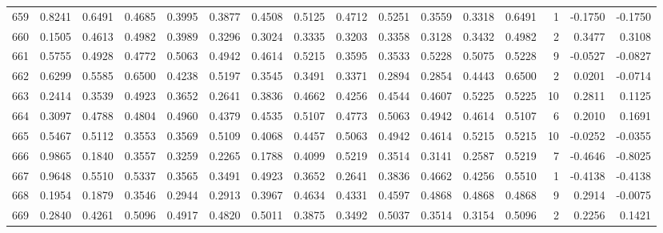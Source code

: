 \begin{tabular}{lrrrrrrrrrrrrrrr}
659 &      0.8241 &  0.6491 &  0.4685 &  0.3995 &  0.3877 &  0.4508 &  0.5125 &  0.4712 &  0.5251 &  0.3559 &   0.3318 &     0.6491 &      1 &                   -0.1750 &                    -0.1750 \\
660 &      0.1505 &  0.4613 &  0.4982 &  0.3989 &  0.3296 &  0.3024 &  0.3335 &  0.3203 &  0.3358 &  0.3128 &   0.3432 &     0.4982 &      2 &                    0.3477 &                     0.3108 \\
661 &      0.5755 &  0.4928 &  0.4772 &  0.5063 &  0.4942 &  0.4614 &  0.5215 &  0.3595 &  0.3533 &  0.5228 &   0.5075 &     0.5228 &      9 &                   -0.0527 &                    -0.0827 \\
662 &      0.6299 &  0.5585 &  0.6500 &  0.4238 &  0.5197 &  0.3545 &  0.3491 &  0.3371 &  0.2894 &  0.2854 &   0.4443 &     0.6500 &      2 &                    0.0201 &                    -0.0714 \\
663 &      0.2414 &  0.3539 &  0.4923 &  0.3652 &  0.2641 &  0.3836 &  0.4662 &  0.4256 &  0.4544 &  0.4607 &   0.5225 &     0.5225 &     10 &                    0.2811 &                     0.1125 \\
664 &      0.3097 &  0.4788 &  0.4804 &  0.4960 &  0.4379 &  0.4535 &  0.5107 &  0.4773 &  0.5063 &  0.4942 &   0.4614 &     0.5107 &      6 &                    0.2010 &                     0.1691 \\
665 &      0.5467 &  0.5112 &  0.3553 &  0.3569 &  0.5109 &  0.4068 &  0.4457 &  0.5063 &  0.4942 &  0.4614 &   0.5215 &     0.5215 &     10 &                   -0.0252 &                    -0.0355 \\
666 &      0.9865 &  0.1840 &  0.3557 &  0.3259 &  0.2265 &  0.1788 &  0.4099 &  0.5219 &  0.3514 &  0.3141 &   0.2587 &     0.5219 &      7 &                   -0.4646 &                    -0.8025 \\
667 &      0.9648 &  0.5510 &  0.5337 &  0.3565 &  0.3491 &  0.4923 &  0.3652 &  0.2641 &  0.3836 &  0.4662 &   0.4256 &     0.5510 &      1 &                   -0.4138 &                    -0.4138 \\
668 &      0.1954 &  0.1879 &  0.3546 &  0.2944 &  0.2913 &  0.3967 &  0.4634 &  0.4331 &  0.4597 &  0.4868 &   0.4868 &     0.4868 &      9 &                    0.2914 &                    -0.0075 \\
669 &      0.2840 &  0.4261 &  0.5096 &  0.4917 &  0.4820 &  0.5011 &  0.3875 &  0.3492 &  0.5037 &  0.3514 &   0.3154 &     0.5096 &      2 &                    0.2256 &                     0.1421 \\

\end{tabular}
